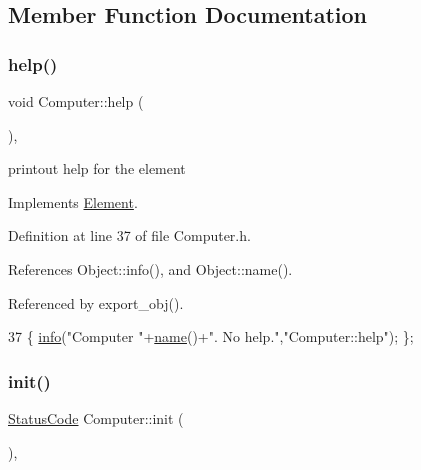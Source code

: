 \subsection{Member Function Documentation}
\mbox{\label{classComputer_aeca79382f17fcfb43320902de5f20aca}} 
\subsubsection{\texorpdfstring{help()}{help()}}
{\footnotesize\ttfamily void Computer\+::help (\begin{DoxyParamCaption}{ }\end{DoxyParamCaption})\hspace{0.3cm}{\ttfamily [inline]}, {\ttfamily [virtual]}}

printout help for the element 

Implements \hyperlink{classElement_a32c0de27acb08e17251cef88c3e9303a}{Element}.



Definition at line 37 of file Computer.\+h.



References Object\+::info(), and Object\+::name().



Referenced by export\+\_\+obj().


\begin{DoxyCode}
37 \{ \hyperlink{classObject_a644fd329ea4cb85f54fa6846484b84a8}{info}(\textcolor{stringliteral}{"Computer "}+\hyperlink{classObject_a300f4c05dd468c7bb8b3c968868443c1}{name}()+\textcolor{stringliteral}{". No help."},\textcolor{stringliteral}{"Computer::help"}); \};
\end{DoxyCode}
\mbox{\label{classComputer_a47ed8b470445d545bffefca31296e754}} 
\subsubsection{\texorpdfstring{init()}{init()}}
{\footnotesize\ttfamily \hyperlink{classStatusCode}{Status\+Code} Computer\+::init (\begin{DoxyParamCaption}{ }\end{DoxyParamCaption})\hspace{0.3cm}{\ttfamily [inline]}, {\ttfamily [virtual]}}

